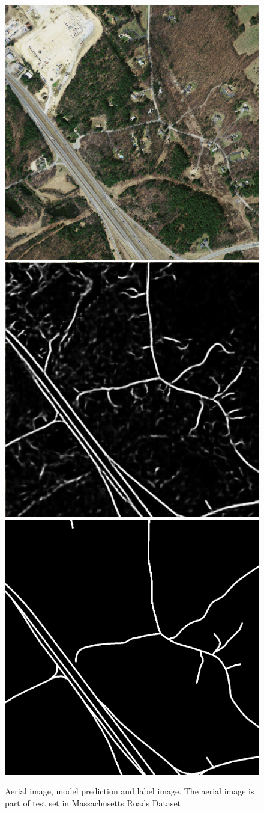 \begin{figure}[t]
\centering
\includegraphics[width=.32\textwidth]{figs/results_data.jpg}\hfill
\includegraphics[width=.32\textwidth]{figs/results_label.jpg}\hfill
\includegraphics[width=.32\textwidth]{figs/label.png}

\caption{Aerial image, model prediction and label image. The aerial image is part of test set in Massachusetts Roads Dataset}
\label{fig:result}
\end{figure}



